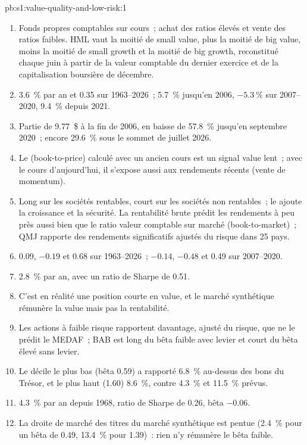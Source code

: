 \begin{solution}{pb:s1:value-quality-and-low-risk:1}
\begin{enumerate}
\item Fonds propres comptables sur cours~; achat des ratios élevés et vente des ratios faibles. HML vaut la moitié de small value, plus la moitié de big value, moins la moitié de small growth et la moitié de big growth,
reconstitué chaque juin à partir de la valeur comptable du dernier exercice et de la capitalisation boursière de décembre.
\item 3.6~\% par an et 0.35 sur 1963--2026~; 5.7~\% jusqu'en 2006, $-5.3~\%$ sur 2007--2020, 9.4~\% depuis 2021.
\item Partie de 9.77~\$ à la fin de 2006, en baisse de 57.8~\% jusqu'en septembre 2020~; encore 29.6~\% sous le sommet de juillet 2026.
\item Le  (book-to-price) calculé avec un ancien cours est un signal value lent~; avec le cours d'aujourd'hui, il s'expose aussi aux rendements récents (vente de momentum).
\item Long sur les sociétés rentables, court sur les sociétés non rentables~; le  ajoute la croissance et la sécurité. La rentabilité brute prédit les rendements à peu près aussi bien que le ratio valeur comptable sur marché (book-to-market)~; QMJ
rapporte des rendements significatifs ajustés du risque dans 25 pays.
\item 0.09, $-0.19$ et 0.68 sur 1963--2026~; $-0.14$, $-0.48$ et 0.49 sur 2007--2020.
\item 2.8~\% par an, avec un ratio de Sharpe de 0.51.
\item C'est en réalité une position courte en value, et le marché synthétique rémunère la value mais pas la rentabilité.
\item Les actions à faible risque rapportent davantage, ajusté du risque, que ne le prédit le MEDAF~; BAB est long du bêta faible avec levier et court du bêta élevé sans levier.
\item Le décile le plus bas (bêta 0.59) a rapporté 6.8~\% au-dessus des bons du Trésor, et le plus haut (1.60) 8.6~\%, contre 4.3~\% et 11.5~\% prévus.
\item 4.3~\% par an depuis 1968, ratio de Sharpe de 0.26, bêta $-0.06$.
\item La droite de marché des titres du marché synthétique est pentue (2.4~\% pour un bêta de 0.49, 13.4~\% pour 1.39)~: rien n'y rémunère le bêta faible.

\end{enumerate}
\end{solution}
